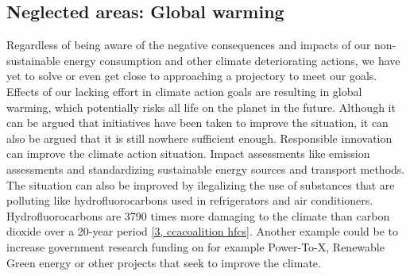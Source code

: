 \subsection*{Neglected areas: Global warming}
Regardless of being aware of the negative consequences and impacts of our non-sustainable energy consumption and other climate deteriorating actions, we have yet to solve or even get close to approaching a projectory to meet our goals.
Effects of our lacking effort in climate action goals are resulting in global warming, which potentially risks all life on the planet in the future.
Although it can be argued that initiatives have been taken to improve the situation, it can also be argued that it is still nowhere sufficient enough.
Responsible innovation can improve the climate action situation. Impact assessments like emission assessments and standardizing sustainable energy sources and transport methods.
The situation can also be improved by ilegalizing the use of substances that are polluting like hydrofluorocarbons used in refrigerators and air conditioners.
Hydrofluorocarbons are 3790 times more damaging to the climate than carbon dioxide over a 20-year period \href{https://www.ccacoalition.org/en/slcps/hydrofluorocarbons-hfcs}{[3, ccacoalition hfcs]}.
Another example could be to increase government research funding on for example Power-To-X, Renewable Green energy or other projects that seek to improve the climate.

\newpage